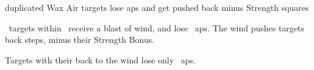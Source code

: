 
  {duplicated}%
  {Wax}%
  {Air}%
  {}%
  {targets lose  \glspl{ap} and get pushed back  minus Strength squares}%
  {
    \spellArea\ targets within \spellRange\ receive a blast of wind, and lose ~\glspl{ap}.
    The wind pushes targets back  steps, minus their Strength Bonus.

  Targets with their back to the wind lose only
  \setcounter{track}{\value{spelllevel}}%
  ~\glspl{ap}.
  }
